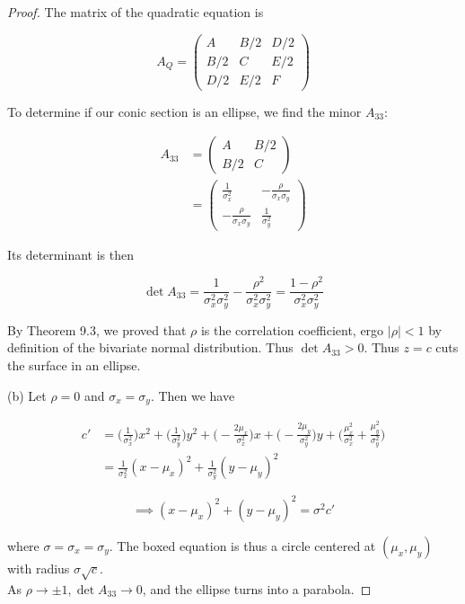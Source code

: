 \documentclass[10pt, oneside]{article}
\begin{document}
\begin{enumerate}[label=9.\arabic*]
\begin{proof}
The matrix of the quadratic equation is

\begingroup
\renewcommand*{\arraystretch}{3}
\[ A_Q = \begin{pmatrix}
A & B/2 & D/2 \\
B/2 & C & E/2 \\
D/2 & E/2 & F
\end{pmatrix} \]
\endgroup

To determine if our conic section is an ellipse, we find the minor $A_{33}$:

\begingroup
\renewcommand*{\arraystretch}{3}
\begin{align*}
A_{33} &= \begin{pmatrix}
A & B/2 \\
B/2 & C
\end{pmatrix} \\
&= \begin{pmatrix}
\frac{1}{\sigma^2_x}  & -\frac{\rho}{\sigma_x \sigma_y} \\
-\frac{\rho}{\sigma_x \sigma_y} & \frac{1}{\sigma^2_y}
\end{pmatrix}
\end{align*}
\endgroup

Its determinant is then

\[ \det A_{33} = \frac{1}{\sigma^2_x \sigma^2_y} - \frac{\rho^2}{\sigma^2_x \sigma^2_y} = \frac{1-\rho^2}{\sigma^2_x \sigma^2_y} \]

By Theorem 9.3, we proved that $\rho$ is the correlation coefficient, ergo $|\rho| < 1$ by definition of the bivariate normal distribution. Thus $\det A_{33} > 0$. Thus $z = c$ cuts the surface in an ellipse.

(b) Let $\rho = 0$ and $\sigma_x = \sigma_y$. Then we have

\begin{align*}
c' &= \bigg( \frac{1}{\sigma^2_x} \bigg) x^2 + \bigg( \frac{1}{\sigma^2_y} \bigg) y^2 + \bigg( -\frac{2\mu_x}{\sigma^2_x} \bigg) x + \bigg(- \frac{2\mu_y}{\sigma^2_y} \bigg) y + \bigg( \frac{\mu^2_x}{\sigma^2_x} + \frac{\mu^2_y}{\sigma^2_y}  \bigg) \\
&= \frac{1}{\sigma^2_x} (x-\mu_x)^2 + \frac{1}{\sigma^2_y} (y - \mu_y)^2
\end{align*}

\[ \implies \boxed{ (x-\mu_x)^2 + (y - \mu_y)^2 = \sigma^2 c' } \]

where $\sigma = \sigma_x = \sigma_y$. The boxed equation is thus a circle centered at $(\mu_x, \mu_y)$ with radius $\sigma \sqrt{c}$. \\
As $\rho \rightarrow \pm 1, \det A_{33} \rightarrow 0$, and the ellipse turns into a parabola.


\end{proof}
\end{enumerate}
\end{document}
